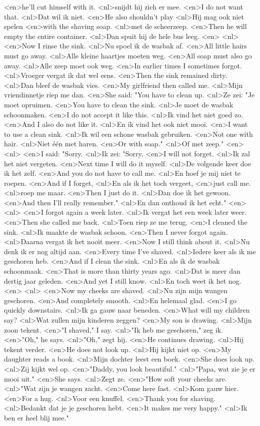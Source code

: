 <en>he'll cut himself with it.
<nl>snijdt hij zich er mee.
<en>I do not want that.
<nl>Dat wil ik niet.
<en>He also shouldn't play
<nl>Hij mag ook niet spelen
<en>with the shaving soap.
<nl>met de scheerzeep.
<en>Then he will empty the entire container.
<nl>Dan spuit hij de hele bus leeg.
<en>
<nl>
<en>Now I rinse the sink.
<nl>Nu spoel ik de wasbak af.
<en>All little hairs must go away.
<nl>Alle kleine haartjes moeten weg.
<en>All soap must also go away.
<nl>Alle zeep moet ook weg.
<en>In earlier times I sometimes forgot.
<nl>Vroeger vergat ik dat wel eens.
<en>Then the sink remained dirty.
<nl>Dan bleef de wasbak vies.
<en>My girlfriend then called me.
<nl>Mijn vriendinnetje riep me dan.
<en>She said: "You have to clean up.
<nl>Ze zei: "Je moet opruimen.
<en>You have to clean the sink.
<nl>Je moet de wasbak schoonmaken.
<en>I do not accept it like this.
<nl>Ik vind het niet goed zo.
<en>And I also do not like it.
<nl>En ik vind het ook niet mooi.
<en>I want to use a clean sink.
<nl>Ik wil een schone wasbak gebruiken.
<en>Not one with hair.
<nl>Niet \'e\'en met haren.
<en>Or with soap."
<nl>Of met zeep."
<en>
<nl>
<en>I said: "Sorry.
<nl>Ik zei: "Sorry.
<en>I will not forget.
<nl>Ik zal het niet vergeten.
<en>Next time I will do it myself.
<nl>De volgende keer doe ik  het zelf.
<en>And you do not have to call me.
<nl>En hoef je mij niet te roepen.
<en>And if I forget,
<nl>En als ik het toch vergeet,
<en>just call me.
<nl>roep me maar.
<en>Then I just do it.
<nl>Dan doe ik het gewoon.
<en>And then I'll really remember."
<nl>En dan onthoud ik het echt."
<en>
<nl>
<en>I forgot again a week later.
<nl>Ik vergat het een week later weer.
<en>Then she called me back.
<nl>Toen riep ze me terug.
<en>I cleaned the sink.
<nl>Ik maakte de wasbak schoon.
<en>Then I never forgot again.
<nl>Daarna vergat ik het nooit meer.
<en>Now I still think about it.
<nl>Nu denk ik er nog altijd aan.
<en>Every time I've shaved.
<nl>Iedere keer als ik me geschoren heb.
<en>And if I clean the sink.
<nl>En als ik de wasbak schoonmaak.
<en>That is more than thirty years ago.
<nl>Dat is meer dan dertig jaar geleden.
<en>And yet I still know.
<nl>En toch weet ik het nog.
<en>
<nl>
<en>Now my cheeks are shaved.
<nl>Nu zijn mijn wangen geschoren.
<en>And completely smooth.
<nl>En helemaal glad.
<en>I go quickly downstairs.
<nl>Ik ga gauw naar beneden.
<en>What will my children say?
<nl>Wat zullen mijn kinderen zeggen?
<en>My son is drawing.
<nl>Mijn zoon tekent.
<en>"I shaved," I say.
<nl>"Ik heb me geschoren," zeg ik.
<en>"Oh," he says.
<nl>"Oh," zegt hij.
<en>He continues drawing.
<nl>Hij tekent verder.
<en>He does not look up.
<nl>Hij kijkt niet op.
<en>My daughter reads a book.
<nl>Mijn dochter leest een boek.
<en>She does look up.
<nl>Zij kijkt wel op.
<en>"Daddy, you look beautiful."
<nl>"Papa, wat zie je er mooi uit."
<en>She says.
<nl>Zegt ze.
<en>"How soft your cheeks are.
<nl>"Wat zijn je wangen zacht.
<en>Come here fast.
<nl>Kom gauw hier.
<en>For a hug.
<nl>Voor een knuffel.
<en>Thank you for shaving.
<nl>Bedankt dat je je geschoren hebt.
<en>It makes me very  happy."
<nl>Ik ben er heel blij mee."
